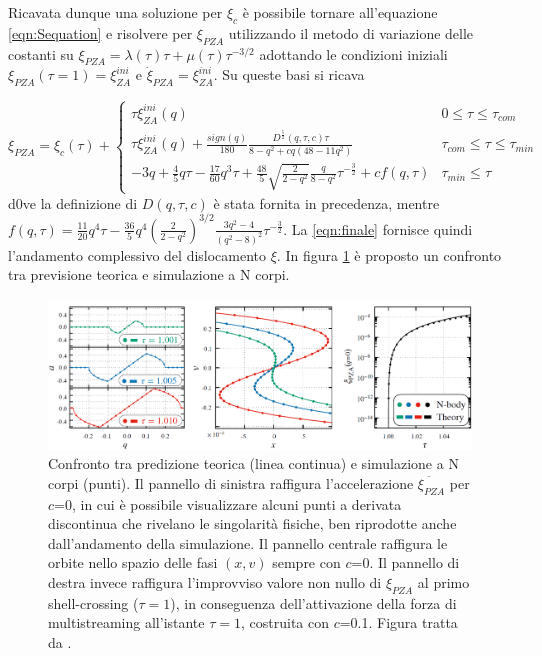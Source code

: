 Ricavata dunque una soluzione per $\xi_c$ è possibile tornare all'equazione \ref{eqn:Sequation} 
e risolvere per $\xi_{PZA}$ utilizzando il metodo di variazione delle costanti su 
$\xi_{PZA} = \lambda(\tau)\tau + \mu(\tau)\tau^{-3/2}$ adottando le condizioni iniziali 
$\xi_{PZA}(\tau = 1) = \xi_{ZA}^{ini}$ e $\dot{\xi}_{PZA}=\xi_{ZA}^{ini}$. Su queste basi si 
ricava

\begin{equation}
    \label{eqn:finale}
    \xi_{PZA} = \xi_c(\tau) + 
    \begin{cases}
        \tau \xi_{ZA}^{ini}(q) & 0 \leq \tau \leq \tau_{com} \\
        \tau \xi_{ZA}^{ini}(q) +\frac{sign(q)}{180} \frac{D^{\frac{5}{2}}(q, \tau, c)\tau}{8-q^2+cq(48-11q^2)} & \tau_{com} \leq \tau \leq \tau_{min} \\
        -3q + \frac{4}{5}q\tau -\frac{17}{60}q^3\tau +\frac{48}{5} \sqrt{\frac{2}{2-q^2}} \frac{q}{8-q^2}\tau^{-\frac{3}{2}}+cf(q, \tau) & \tau_{min} \leq \tau
    \end{cases}
\end{equation}
d0ve la definizione di $D(q, \tau, c)$ è stata fornita in precedenza, mentre 
$f(q, \tau) = \frac{11}{20}q^4\tau -\frac{36}{5}q^4\left(\frac{2}{2-q^2}\right)^{3/2}\frac{3q^2-4}{(q^2-8)^2}\tau^{-\frac{3}{2}}$.
La \ref{eqn:finale} fornisce quindi l'andamento complessivo del dislocamento $\xi$. In figura \ref{fig:fig2} è proposto un confronto
tra previsione teorica e simulazione a N corpi.


\begin{center}
    \begin{figure}[H]
		\centering
		\includegraphics[scale=0.35, angle=0]{fig2.png}
        \caption{Confronto tra predizione teorica (linea continua) e simulazione a N corpi (punti).
        Il pannello di sinistra raffigura l'accelerazione $\ddot{\xi_{PZA}}$ per $c$=0, in cui è possibile 
        visualizzare alcuni punti a derivata discontinua che rivelano le singolarità fisiche, ben riprodotte 
        anche dall'andamento della simulazione. Il pannello centrale raffigura le orbite nello spazio delle fasi 
        $(x, v)$ sempre con $c$=0. Il pannello di destra invece raffigura l'improvviso valore non nullo di $\xi_{PZA}$
        al primo shell-crossing ($\tau = 1$), in conseguenza dell'attivazione della forza di multistreaming all'istante
        $\tau = 1$, costruita con $c$=0.1. Figura tratta da \cite{rampf}.
        }
        \label{fig:fig2}
	\end{figure}
\end{center}

